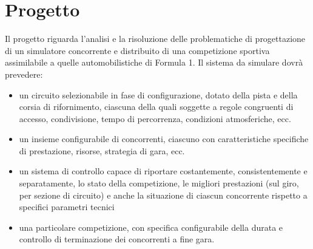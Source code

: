 \section{Progetto}
Il progetto riguarda l'analisi e la risoluzione delle problematiche di progettazione di un simulatore 
concorrente e distribuito di una competizione sportiva assimilabile a quelle automobilistiche di Formula 1.
Il sistema da simulare dovr\`{a} prevedere:
\begin{itemize}
    \item{un circuito selezionabile in fase di configurazione, dotato della pista e della corsia di rifornimento, 
ciascuna della quali soggette a regole congruenti di accesso, condivisione, tempo di percorrenza, condizioni atmosferiche, ecc.}
    \item{un insieme configurabile di concorrenti, ciascuno con caratteristiche specifiche di prestazione, risorse, strategia di gara, ecc.}
    \item{un sistema di controllo capace di riportare costantemente, consistentemente e separatamente, 
lo stato della competizione, le migliori prestazioni (sul giro, per sezione di circuito) 
e anche la situazione di ciascun concorrente rispetto a specifici parametri tecnici}
    \item{una particolare competizione, con specifica configurabile della durata e controllo di terminazione dei concorrenti a fine gara.}
\end{itemize}
